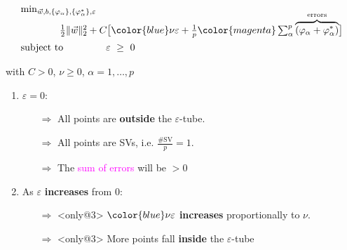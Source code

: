 \begin{frame}%




\begin{minipage}{7.5cm}

\begin{block}{%
}
\slidesonly{\vspace{-5mm}}
	\begingroup
	\footnotesize
     \begin{equation}
        \begin{array}{ll}
        \min_{\vec w, b,\{\varphi_\alpha\}, \{\varphi_\alpha^*\}, \varepsilon} & \\[-1mm]
        & \kern-11ex\frac{1}{2} \lVert \vec w \rVert_{2}^{2} + C \big\lbrack {\color{blue}\nu \varepsilon} + \frac{1}{p} {\color{magenta}\sum_{\alpha}^p \overbrace{(\varphi_\alpha + \varphi_\alpha^*)}^{\text{errors}}} \big\rbrack\\[2mm]
        \text{subject to} &
        \varepsilon~\ge~0\\
        \end{array}
        \label{eq:primalnuepsonly}
     \end{equation}
     
     \slidesonly{\vspace{-2mm}}
        with $C>0$, $\nu \ge 0$, $\alpha=1,\ldots,p$
     \endgroup
\end{block}
\end{minipage}

\begin{enumerate}
\item<only@1> $\varepsilon = 0$:
\begin{itemize}
\item[$\Rightarrow$] All points are \textbf{outside} the $\varepsilon$-tube.{}
\item[$\Rightarrow$] All points are SVs, i.e. $\frac{\#\mathrm{SV}}{p}=1$.
\item[$\Rightarrow$] The \textcolor{magenta}{sum of errors} will be $> 0$
\end{itemize}
\pause
\item<only@2-6>As $\varepsilon$ \textbf{increases} from $0$:
\begin{itemize}
\item[$\Rightarrow$]<only@3> ${\color{blue}\nu\varepsilon}$ \textbf{increases} proportionally to $\nu$.
\item[$\Rightarrow$]<only@3> More points fall \textbf{inside} the $\varepsilon$-tube


\end{itemize}
\end{enumerate}
\end{frame}

